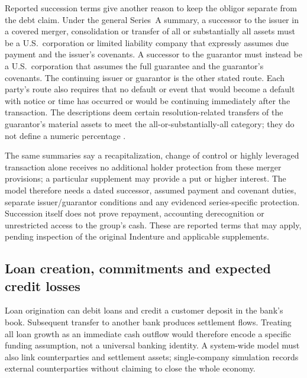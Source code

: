 \newpage
Reported succession terms give another reason to keep the obligor separate
from the debt claim. Under the general Series~A summary, a successor to the
issuer in a covered merger, consolidation or transfer of all or substantially
all assets must be a U.S.\ corporation or limited liability company that
expressly assumes due payment and the issuer's covenants. A successor to the
guarantor must instead be a U.S.\ corporation that assumes the full guarantee
and the guarantor's covenants. The continuing issuer or guarantor is the other
stated route. Each party's route also requires that no default or event that
would become a default with notice or time has occurred or would be continuing
immediately after the transaction. The descriptions deem certain
resolution-related transfers of the guarantor's material assets to meet the
all-or-substantially-all category; they do not define a numeric percentage
\citep{jpmorgan2022tenk,jpmorgan2023tenk,jpmorgan2024tenk,jpmorgan2025tenk}.

The same summaries say a recapitalization, change of control or highly
leveraged transaction alone receives no additional holder protection from
these merger provisions; a particular supplement may provide a put or higher
interest. The model therefore needs a dated successor, assumed payment and
covenant duties, separate issuer/guarantor conditions and any evidenced
series-specific protection. Succession itself does not prove repayment,
accounting derecognition or unrestricted access to the group's cash. These
are reported terms that may apply, pending inspection of the original
Indenture and applicable supplements.

\subsection{Loan creation, commitments and expected credit losses}
\label{sec:bank-loans-commitments}

Loan origination can debit loans and credit a customer deposit in the bank's
book. Subsequent transfer to another bank produces settlement flows. Treating
all loan growth as an immediate cash outflow would therefore encode a specific
funding assumption, not a universal banking identity. A system-wide model must
also link counterparties and settlement assets; single-company simulation
records external counterparties without claiming to close the whole economy.

